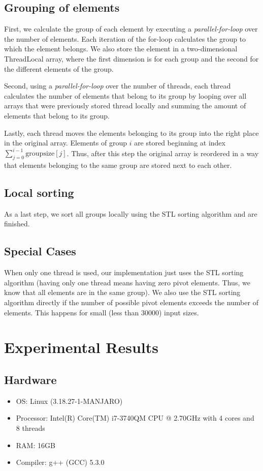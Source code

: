 \documentclass{llncs}
\begin{document}
\subsection{Grouping of elements}
First, we calculate the group of each element by executing a \emph{parallel-for-loop} over the number of elements. Each iteration of the for-loop calculates the group to which the element belongs. We also store the element in a two-dimensional ThreadLocal array, where the first dimension is for each group and the second for the different elements of the group. \par
Second, using a \emph{parallel-for-loop} over the number of threads, each thread calculates the number of elements that belong to its group by looping over all arrays that were previously stored thread locally and summing the amount of elements that belong to its group.  \par
Lastly, each thread moves the elements belonging to its group into the right place in the original array. Elements of group $i$ are stored beginning at index  $\sum_{j=0}^{i-1}\text{groupsize}[j]$. Thus, after this step the original array is reordered in a way that elements belonging to the same group are stored next to each other.
\subsection{Local sorting}
As a last step, we sort all groups locally using the STL sorting algorithm and are finished.
\subsection{Special Cases}
When only one thread is used, our implementation just uses the STL sorting algorithm (having only one thread means having zero pivot elements. Thus, we know that all elements are in the same group). We also use the STL sorting algorithm directly if the number of possible pivot elements exceeds the number of elements. This happens for small (less than $30000$) input sizes.
\section{Experimental Results}
\subsection{Hardware}
\begin{itemize}
	\item OS: Linux (3.18.27-1-MANJARO)
	\item Processor: Intel(R) Core(TM) i7-3740QM CPU @ 2.70GHz with 4 cores and 8 threads
	\item RAM: 16GB
	\item Compiler: g++ (GCC) 5.3.0
\end{itemize}
\end{document}
